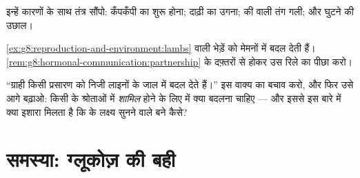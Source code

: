 \begin{exercise}[$\star\star$]\label{exo:g8:hormonal-communication:10}
इन्हें कारणों के साथ तंत्र सौंपो: कँपकँपी का शुरू होना; दाढ़ी का उगना;
 की  वाली तंग गली; और घुटने की उछाल।
\end{exercise}

\begin{exercise}[$\star\star$]\label{exo:g8:hormonal-communication:11}
\cref{ex:g8:reproduction-and-environment:lambs} वाली भेड़ें  को
मेमनों में बदल देती हैं।
\cref{rem:g8:hormonal-communication:partnership} के दफ़्तरों से होकर उस
रिले का पीछा करो।
\end{exercise}

\begin{exercise}[$\star\star\star$]\label{exo:g8:hormonal-communication:12}
``ग्राही किसी प्रसारण को निजी लाइनों के जाल में बदल देते हैं।'' इस वाक्य
का बचाव करो, और फिर उसे आगे बढ़ाओ: किसी  के श्रोताओं में
\emph{शामिल} होने के लिए  में क्या बदलना चाहिए --- और इससे इस बारे
में क्या इशारा मिलता है कि  के लक्ष्य सुनने वाले बने कैसे?
\end{exercise}

\section{समस्या: ग्लूकोज़ की बही}

